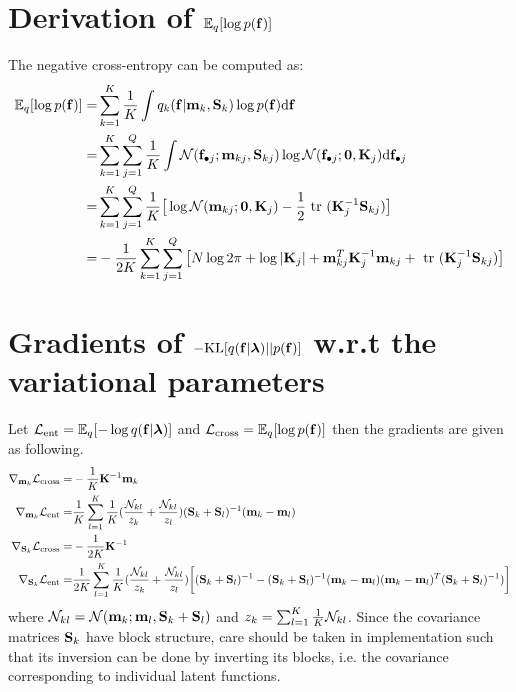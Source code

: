 \documentclass{article} %
\begin{document}
\section[Derivation of the cross-entropy term]{Derivation of $\expectation_q [\log p(\f)]$}
The negative cross-entropy can be computed as:
\begin{align}
\expectation_q [\log p(\f)] 
=&  \sum_{k=1}^K \frac{1}{K} \int q_k(\f | \m_k, \S_k) \log p(\f) \der \f \\
=& \sum_{k=1}^K \sum_{j=1}^Q \frac{1}{K} \int \Normal(\fj; \m_{kj}, \S_{kj}) \log \Normal(\fj; \vec{0}, \K_j) \der \fj \\
=& \sum_{k=1}^K \sum_{j=1}^Q \frac{1}{K} \big[ \log \Normal(\m_{kj}; \vec{0}, \K_j) - \frac{1}{2} \trace (\K_j^{-1} \S_{kj}) \big] \\
=& -\frac{1}{2K} \sum_{k=1}^K \sum_{j=1}^Q \big[ N \log 2\pi  + \log |\K_j| + \m_{kj}^T \K_j^{-1} \m_{kj} + \trace (\K_j^{-1} \S_{kj}) \big]
\end{align}

\section[Gradients of the $\KL$ divergence w.r.t the variational parameters]{Gradients of $-\KL[q(\f | \llambda) || p(\f)]$ w.r.t the variational parameters}
\newcommand{\mk}{\m_k}
\newcommand{\Sk}{\S_k}
Let $\Lent = \expectation_q [ - \log q(\f | \llambda)]$ and $\Lcross = \expectation_q  [\log p(\f)]$ then the gradients are given as following.
\begin{align}
\nabla_{\mk} \Lcross =& - \frac{1}{K} \K^{-1} \mk \\ \nonumber
\nabla_{\mk} \Lent =&  \frac{1}{K} \sum_{l=1}^K \frac{1}{K} (\frac{\Normal_{kl}}{z_k} + \frac{\Normal_{kl}}{z_l}) (\S_k + \S_l)^{-1} (\m_k - \m_l) \\ 
\label{eq:crossgradient}
\nabla_{\Sk} \Lcross =& - \frac{1}{2K} \K^{-1} \\ \noindent
\label{eq:entgradient}
\nabla_{\Sk} \Lent =& \frac{1}{2K} \sum_{l=1}^K \frac{1}{K} (\frac{\Normal_{kl}}{z_k} + \frac{\Normal_{kl}}{z_l}) \bigg[ (\S_k + \S_l)^{-1} 
 - (\S_k + \S_l)^{-1} (\m_k - \m_l) (\m_k - \m_l)^T (\S_k + \S_l)^{-1}) \bigg]
\end{align}
where $\Normal_{kl} = \Normal(\m_k; \m_l, \S_k + \S_l)$ and $z_k = \sum_{l=1}^K \frac{1}{K} \Normal_{kl}$.
Since the covariance matrices $\S_k$ have block structure, care should be taken in implementation such that its inversion can be done by inverting its blocks, i.e. the covariance corresponding to individual latent functions.
\end{document}
